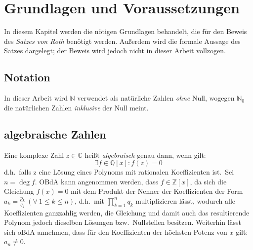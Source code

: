 
\section{Grundlagen und Voraussetzungen}
    \label{sec:preliminaries}
    \textrm{In diesem Kapitel werden die nötigen Grundlagen behandelt, die für den Beweis des \emph{Satzes von Roth}
    benötigt werden. Außerdem wird die formale Aussage des Satzes dargelegt; der Beweis wird jedoch nicht in dieser
    Arbeit vollzogen.}
    
    \subsection{Notation}
    \label{subsec:notation}
        \textrm{In dieser Arbeit wird $\mathbb{N}$ verwendet als natürliche Zahlen \emph{ohne} Null, wogegen $\mathbb{N}_0$
        die natürlichen Zahlen \emph{inklusive} der Null meint.}
    
    \subsection{algebraische Zahlen}
        \label{subsec:algebraic-numbers}
        \textrm{Eine komplexe Zahl $z \in \mathbb{C}$ heißt \emph{algebraisch} genau dann, wenn gilt:}
        \begin{equation}
            \exists f \in \mathbb{Q}[x] : f(z) = 0 \label{eq:def-algebraic}
        \end{equation}
        \textrm{d.h.\ falls z eine Lösung eines Polynoms mit rationalen Koeffizienten ist.\ Sei $n = \deg f$. OBdA kann
        angenommen werden, dass $f \in \mathbb{Z}[x]$, da sich die Gleichung $f(x) = 0$ mit dem Produkt der Nenner der
        Koeffizienten der Form $a_k = \frac{p_k}{q_k} \ (\forall \  1 \leq k \leq n)$, d.h.\ mit $\prod_{k=1}^n q_k$
        multiplizieren lässt, wodurch alle Koeffizienten ganzzahlig werden, die Gleichung und damit auch das
        resultierende Polynom jedoch dieselben Lösungen bzw.\ Nullstellen besitzen.
        \newline
        Weiterhin lässt sich oBdA annehmen, dass für den Koeffizienten der höchsten Potenz von $x$ gilt: $a_n \neq 0$.}
    
